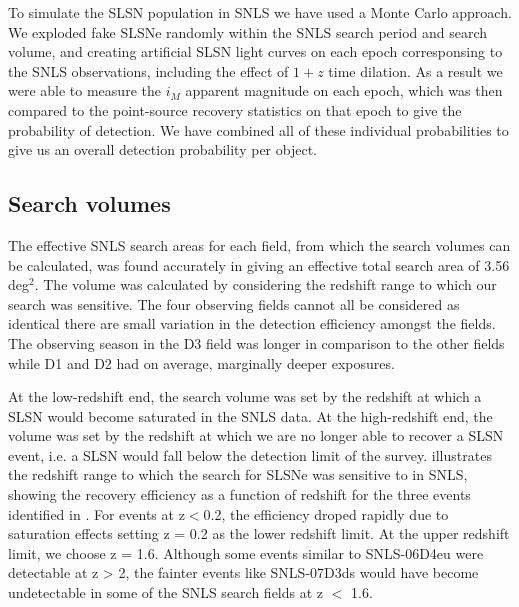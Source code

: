 To simulate the SLSN population in SNLS we have used a Monte Carlo approach. We exploded fake SLSNe randomly within the SNLS search period and search volume, and creating artificial SLSN light curves on each epoch corresponsing to the SNLS observations, including the effect of $1+z$ time dilation. As a result we were able to measure the $i_M$ apparent magnitude on each epoch, which was then compared to the point-source recovery statistics on that epoch to give the probability of detection. We have combined all of these individual probabilities to give us an overall detection probability per object.

\subsection{Search volumes}
\label{sec:search-volumes}
The effective SNLS search areas for each field, from which the search volumes can be calculated, was found accurately in \citet{2012AJ....144...59P} giving an effective total search area of 3.56\,deg$^2$. The volume was calculated by considering the redshift range to which our search was sensitive. The four observing fields cannot all be considered as identical there are small variation in the detection efficiency amongst the fields. The observing season in the D3 field was longer in comparison to the other fields while D1 and D2 had on average, marginally deeper exposures.

At the low-redshift end, the search volume was set by the redshift at which a SLSN would become saturated in the SNLS data. At the high-redshift end, the volume was set by the redshift at which we are no longer able to recover a SLSN event, i.e. a SLSN would fall below the detection limit of the survey.  illustrates the redshift range to which the search for SLSNe was sensitive to in SNLS, showing the recovery efficiency as a function of redshift for the three events identified in . For events at z$<$0.2, the efficiency droped rapidly due to saturation effects setting z = 0.2 as the lower redshift limit. At the upper redshift limit, we choose z = 1.6. Although some events similar to SNLS-06D4eu were detectable at z > 2, the fainter events like SNLS-07D3ds would have become undetectable in some of the SNLS search fields at z $<$ 1.6.

